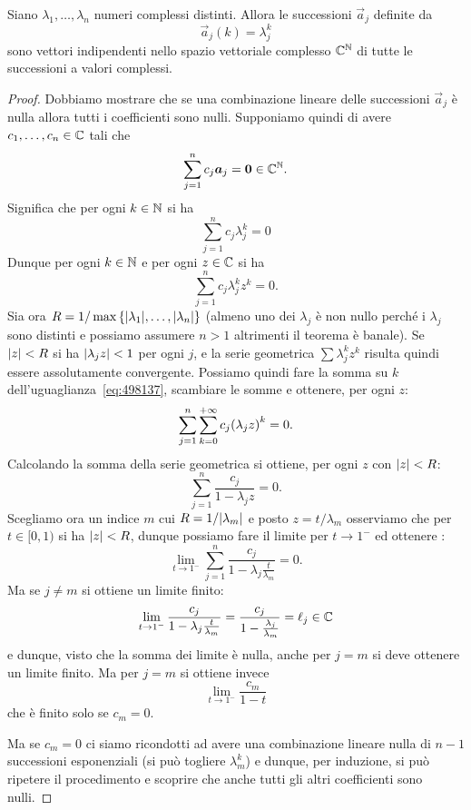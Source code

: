 \begin{theorem}
\label{th:indipendenza_successioni_esponenziali}
Siano $\lambda_1, \dots, \lambda_n$ numeri complessi distinti. Allora
le successioni $\vec a_j$ definite da
\[
  \vec a_j (k) = \lambda_j^k
\]
sono vettori indipendenti nello spazio vettoriale complesso $\mathbb C^\mathbb N$ di tutte le
successioni a valori complessi.
\end{theorem}
%
\begin{proof}
Dobbiamo mostrare che se una combinazione lineare delle
successioni $\vec a_j$ è nulla allora tutti i coefficienti
sono nulli.
Supponiamo quindi di avere $c_1, \dots, c_n\in \mathbb C$ tali che
\[
  \sum_{j=1}^n c_j \boldsymbol a_j = \boldsymbol 0 \in \mathbb C^\mathbb N.
\]
Significa che per ogni $k\in \mathbb N$ si ha
\begin{equation}\label{eq:47862}
  \sum_{j=1}^n c_j \lambda_j^k = 0
\end{equation}
Dunque per ogni $k\in \mathbb N$ e per ogni $z\in \mathbb C$ si ha
\begin{equation}\label{eq:498137}
  \sum_{j=1}^n c_j \lambda_j^k z^k = 0.
\end{equation}
Sia ora $R=1/\max{\left\{ {\left|\lambda_1\right|}, \dots, {\left|\lambda_n\right|} \right\}}$ (almeno uno dei $\lambda_j$
è non nullo perché i $\lambda_j$ sono distinti e possiamo assumere
$n>1$ altrimenti il teorema è banale).
Se ${\left|z\right|}<R$ si ha ${\left|\lambda_j z\right|}< 1$ per ogni $j$,
e la serie geometrica $\sum \lambda_j^k z^k$ risulta quindi essere
assolutamente convergente. Possiamo quindi fare la somma su $k$
dell'uguaglianza~\eqref{eq:498137}, scambiare le somme e ottenere,
per ogni $z$:
\[
  \sum_{j=1}^n \sum_{k=0}^{+\infty} c_j {\left( \lambda_j z \right)}^k = 0.
\]
Calcolando la somma della serie geometrica si ottiene, per ogni $z$
con ${\left|z\right|}<R$:
\[
\sum_{j=1}^n \frac{c_j}{1-\lambda_j z} = 0.
\]
Scegliamo ora un indice $m$ cui $R = 1/{\left|\lambda_m\right|}$ e
posto $z = t / \lambda_m$ osserviamo che per $t\in[0,1)$
si ha ${\left|z\right|} < R$, dunque possiamo fare il limite
per $t\to 1^-$ ed ottenere :
\[
  \lim_{t\to 1^-}
  \sum_{j=1}^n \frac{c_j}{1- \lambda_j \frac{t}{\lambda_m} } = 0.
\]
Ma se $j\neq m$ si ottiene un limite finito:
\[
  \lim_{t\to 1^-} \frac{c_j}{1- \lambda_j \frac{t}{\lambda_m} }
  = \frac{c_j}{1 - \frac{\lambda_j}{\lambda_m}} = \ell_j \in \mathbb C
\]
e dunque, visto che la somma dei limite è nulla,
anche per $j=m$ si deve ottenere un limite finito.
Ma per $j=m$ si ottiene invece
\[
  \lim_{t\to 1^-}\frac{c_m}{1 - t}
\]
che è finito solo se $c_m=0$.

Ma se $c_m=0$ ci siamo ricondotti ad avere una combinazione lineare
nulla di $n-1$ successioni esponenziali (si può togliere $\lambda_m^k$)
e dunque, per induzione, si può ripetere il procedimento e scoprire
che anche tutti gli altri coefficienti sono nulli.
\end{proof}

